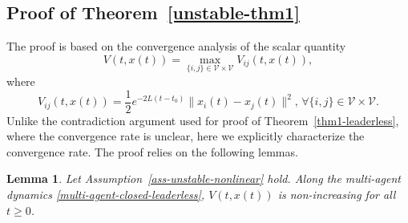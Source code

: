 \documentclass[a4paper, 11pt]{article}
\newtheorem{lemma}{Lemma}
\begin{document}
\subsection{Proof of Theorem~\ref{unstable-thm1}}\label{proof-unstable-thm1}
The proof is based on the convergence analysis of the scalar quantity
\begin{equation}\label{unstable-lyap-edge}
V(t,x(t))=\max_{\{i,j\}\in\mathcal{V}\times\mathcal{V}}V_{ij}(t,x(t)),
\end{equation}
where
\begin{equation}\label{unstable-lyap-agent-by-agent}
V_{ij}(t,x(t))=\frac{1}{2}e^{-2L(t-t_0)}\|x_i(t)-x_j(t)\|^2, \, \forall \{i,j\}\in\mathcal{V}\times\mathcal{V}.
\end{equation}
Unlike the contradiction argument used for proof of Theorem~\ref{thm1-leaderless}, where the convergence rate is unclear, here we explicitly characterize
the convergence rate. The proof relies on the following lemmas.

\begin{lemma}\label{lemma-invariant-unstable}
Let Assumption~\ref{ass-unstable-nonlinear} hold.
Along the multi-agent dynamics \eqref{multi-agent-closed-leaderless}, $V(t,x(t)) $ is non-increasing for all $t \geq 0$.
\end{lemma}
\end{document}
